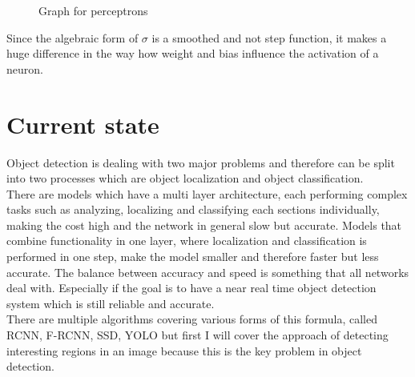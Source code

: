 \begin{figure}[H]
    \begin{center}
\caption{Graph for perceptrons}
\end{center}
\end{figure}
\vspace{0.25cm} \noindent
Since the algebraic form of {$\sigma$} is a smoothed and not step function, it makes a huge difference in the way how weight and bias influence
the activation of a neuron.

\section{Current state}
Object detection is dealing with two major problems and therefore can be split into two processes which are object localization and object
classification.  \\
There are models which have a multi layer architecture, each performing complex tasks such as analyzing, localizing and classifying each
sections individually, making the cost high and the network in general slow but accurate.
Models that combine functionality in one layer, where localization and classification is performed in one step, make the
model smaller and therefore faster but less accurate.
The balance between accuracy and speed is something that all networks deal with. Especially if the goal is to have a near real time object
detection system which is still reliable and accurate.\\
There are multiple algorithms covering various forms of this formula, called RCNN, F-RCNN, SSD, YOLO but first I will cover
the approach of detecting interesting regions in an image because this is the key problem in object detection.


